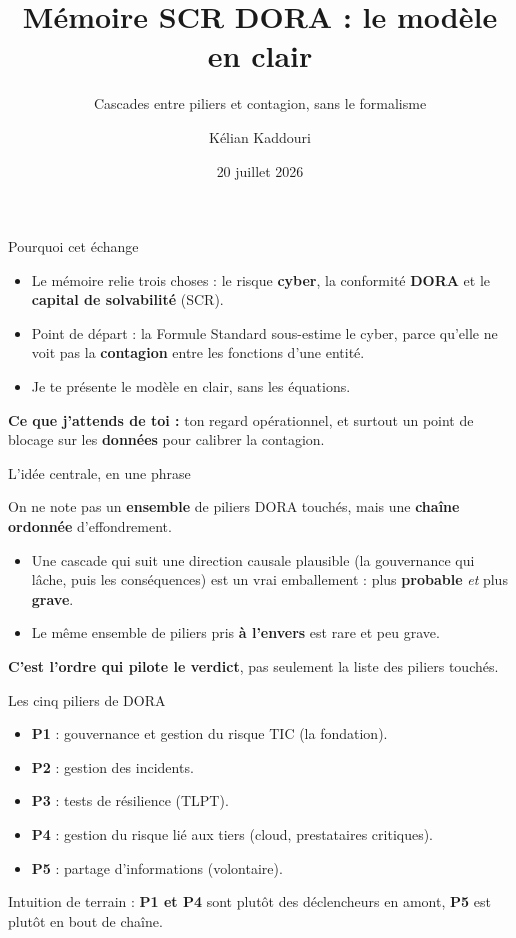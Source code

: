 \documentclass[11pt]{beamer}
\title[Point Mehdi]{Mémoire SCR DORA : le modèle en clair}
\subtitle{Cascades entre piliers et contagion, sans le formalisme}
\author[K. Kaddouri]{Kélian Kaddouri}
\institute[ENSAE / Nexialog]{ENSAE / Nexialog Consulting}
\date[20/07/2026]{20 juillet 2026}
\begin{document}
\begin{frame}
\titlepage
\end{frame}

\begin{frame}{Pourquoi cet échange}
\begin{itemize}
\item Le mémoire relie trois choses : le risque \textbf{cyber}, la conformité \textbf{DORA}
      et le \textbf{capital de solvabilité} (SCR).
\item Point de départ : la Formule Standard sous-estime le cyber, parce qu'elle ne voit pas
      la \textbf{contagion} entre les fonctions d'une entité.
\item Je te présente le modèle en clair, sans les équations.
\end{itemize}
\vfill
\textbf{Ce que j'attends de toi :} ton regard opérationnel, et surtout un point de blocage
sur les \textbf{données} pour calibrer la contagion.
\end{frame}

\begin{frame}{L'idée centrale, en une phrase}
\begin{block}{}
On ne note pas un \textbf{ensemble} de piliers DORA touchés, mais une \textbf{chaîne
ordonnée} d'effondrement.
\end{block}
\begin{itemize}
\item Une cascade qui suit une direction causale plausible (la gouvernance qui lâche, puis
      les conséquences) est un vrai emballement : plus \textbf{probable} \emph{et} plus
      \textbf{grave}.
\item Le même ensemble de piliers pris \textbf{à l'envers} est rare et peu grave.
\end{itemize}
\vfill
\begin{center}
\textbf{C'est l'ordre qui pilote le verdict}, pas seulement la liste des piliers touchés.
\end{center}
\end{frame}

\begin{frame}{Les cinq piliers de DORA}
\begin{itemize}
\item \textbf{P1} : gouvernance et gestion du risque TIC (la fondation).
\item \textbf{P2} : gestion des incidents.
\item \textbf{P3} : tests de résilience (TLPT).
\item \textbf{P4} : gestion du risque lié aux tiers (cloud, prestataires critiques).
\item \textbf{P5} : partage d'informations (volontaire).
\end{itemize}
\vfill
Intuition de terrain : \textbf{P1 et P4} sont plutôt des déclencheurs en amont,
\textbf{P5} est plutôt en bout de chaîne.
\end{frame}
\end{document}
